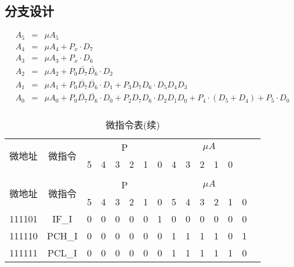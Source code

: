 \documentclass[10pt]{book}
\begin{document}
\subsection{分支设计}
\begin{eqnarray}
A_5 &=& \mu A_5 \\
A_4 &=& \mu A_4 + P_x\cdot D_7 \\
A_3 &=& \mu A_3 + P_x\cdot D_6 \\
A_2 &=& \mu A_2 + P_0\bar{D_7}\bar{D_6}\cdot D_2 \\
A_1 &=& \mu A_1 + P_0\bar{D_7}\bar{D_6}\cdot D_1 + P_3D_7D_6\cdot D_5D_4D_3 \\
A_0 &=& \mu A_0 + P_0\bar{D_7}\bar{D_6}\cdot D_0 + P_2D_7D_6\cdot D_2D_1D_0 + P_4\cdot(D_5+D_4)+P_5\cdot D_0 \\
\end{eqnarray}

\begin{longtable}{|c|c|c|c|c|c|c|c|c|c|c|c|c|c|c|}
\caption{微指令表} \label{tb_micro_prog3} \\
\hline
\multirow{2}{1.5cm}{微地址} & \multirow{2}{1.5cm}{微指令} & \multicolumn{6}{c|}{P} & \multicolumn {6}{c|}{$\mu A$} \\
\cline{3-14}
                          &           & 5 & 4 & 3 & 2 & 1 & 0 & 4 & 3 & 2 & 1 & 0 \\
\hline
\endfirsthead
\caption{微指令表(续)} \\
\hline
\multirow{2}{1.5cm}{微地址} & \multirow{2}{1.5cm}{微指令} & \multicolumn{6}{c|}{P} & \multicolumn {6}{c|}{$\mu A$} \\
\cline{3-14}
                          &           & 5 & 4 & 3 & 2 & 1 & 0 & 5 & 4 & 3 & 2 & 1 & 0 \\
\hline
\endhead
\hline
\endfoot
111101 & IF\_I 		& 0 & 0 & 0 & 0 & 0 & 1  & 0 & 0 & 0 & 0 & 0 & 0 \\
111110 & PCH\_I 	& 0 & 0 & 0 & 0 & 0 & 0  & 1 & 1 & 1 & 1 & 0 & 1 \\
111111 & PCL\_I 	& 0 & 0 & 0 & 0 & 0 & 0  & 1 & 1 & 1 & 1 & 1 & 0 \\
\end{longtable}
\end{document}
